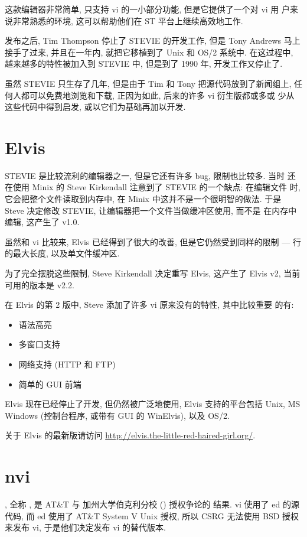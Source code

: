 这款编辑器非常简单, 只支持 vi 的一小部分功能, 但是它提供了一个对 vi 用
户来说非常熟悉的环境, 这可以帮助他们在 ST 平台上继续高效地工作.

发布之后, Tim Thompson 停止了 STEVIE 的开发工作, 但是 Tony Andrews 马上
接手了过来, 并且在一年内, 就把它移植到了 Unix 和 OS/2 系统中. 在这过程中,
越来越多的特性被加入到 STEVIE 中, 但是到了 1990 年, 开发工作又停止了.

虽然 STEVIE 只生存了几年, 但是由于 Tim 和 Tony 把源代码放到了新闻组上,
任何人都可以免费地浏览和下载, 正因为如此, 后来的许多 vi 衍生版都或多或
少从这些代码中得到启发, 或以它们为基础再加以开发.

\section{Elvis}
\label{sec:elvis}
STEVIE 是比较流利的编辑器之一, 但是它还有许多 bug, 限制也比较多. 当时 
还在使用 Minix 的 Steve Kirkendall 注意到了 STEVIE 的一个缺点: 在编辑文件
时, 它会把整个文件读取到内存中, 在 Minix 中这并不是一个很明智的做法.
于是 Steve 决定修改 STEVIE, 让编辑器把一个文件当做缓冲区使用, 而不是
在内存中编辑, 这产生了  v1.0.

虽然和 vi 比较来, Elvis 已经得到了很大的改善, 但是它仍然受到同样的限制
--- 行的最大长度, 以及单文件缓冲区.

为了完全摆脱这些限制, Steve Kirkendall 决定重写 Elvis, 这产生了 Elvis
v2, 当前可用的版本是 v2.2.

在 Elvis 的第 2 版中, Steve 添加了许多 vi 原来没有的特性, 其中比较重要
的有:
\begin{itemize}
\item 语法高亮
\item 多窗口支持
\item 网络支持 (HTTP 和 FTP)
\item 简单的 GUI 前端
\end{itemize}
Elvis 现在已经停止了开发, 但仍然被广泛地使用, Elvis 支持的平台包括
Unix, MS Windows (控制台程序, 或带有 GUI 的 WinElvis), 以及 OS/2.
\begin{warning}
关于 Elvis 的最新版请访问
\url{http://elvis.the-little-red-haired-girl.org/}.
\end{warning}

\section{nvi}
\label{sec:nvi}
, 全称 , 是 AT\&T 与 加州大学伯克利分校 
 () 授权争论的
结果. vi 使用了 ed 的源代码, 而 ed 使用了 AT\&T System V Unix 授权,
所以 CSRG 无法使用 BSD 授权来发布 vi, 于是他们决定发布 vi 的替代版本.

